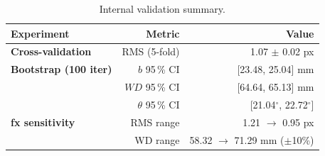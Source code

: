 \begin{table}[H]
\centering
\caption{Internal validation summary.}
\label{tab:validation_summary}
\begin{tabular}{lrr}
\toprule
Experiment & Metric & Value \\
\midrule
\textbf{Cross-validation} & RMS (5-fold) & 1.07 $\pm$ 0.02 px \\
\textbf{Bootstrap (100 iter)} & $b$ 95\,\% CI & [23.48, 25.04] mm \\
 & $WD$ 95\,\% CI & [64.64, 65.13] mm \\
 & $\theta$ 95\,\% CI & [21.04$^\circ$, 22.72$^\circ$] \\
\textbf{fx sensitivity} & RMS range & 1.21 $\to$ 0.95 px \\
 & WD range & 58.32 $\to$ 71.29 mm ($\pm$10\%) \\
\bottomrule
\end{tabular}
\end{table}
